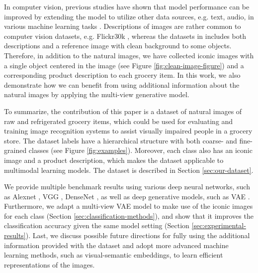 In computer vision, previous studies have shown that model performance can be improved by extending the model to utilize other data sources, e.g. text, audio, in various machine learning tasks . Descriptions of images are rather common to computer vision datasets, e.g. Flickr30k , whereas the datasets in  includes both descriptions and a reference image with clean background to some objects. Therefore, in addition to the natural images, we have collected iconic images with a single object centered in the image (see Figure \ref{fig:clean-image-figure}) and a corresponding product description to each grocery item. In this work, we also demonstrate how we can benefit from using additional information about the natural images by applying the multi-view generative model.

To summarize, the contribution of this paper is a dataset of natural images of raw and refrigerated grocery items, which could be used for evaluating and training image recognition systems to assist visually impaired people in a grocery store. 
The dataset labels have a hierarchical structure with both coarse- and fine-grained classes (see Figure \ref{fig:examples}). Moreover, 
each class also has an iconic image and a product description, which makes the dataset applicable to multimodal learning models. The dataset is described in Section \ref{sec:our-dataset}. 

We provide multiple benchmark results using various deep neural networks, such as Alexnet , VGG , DenseNet , as well as deep generative models, such as VAE . 
Furthermore, we adapt a multi-view VAE model to make use of the iconic images for each class (Section \ref{sec:classification-methods}), and show that it improves the classification accuracy given the same model setting (Section \ref{sec:experimental-results}). Last, we discuss possible future directions for fully using the additional information provided with the dataset and adopt more advanced machine learning methods, such as visual-semantic embeddings, to learn efficient representations of the images. 